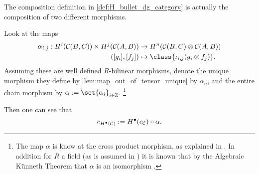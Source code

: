\begin{remark}
    \label{rem:H_bullet_composition_alpha}
    The composition definition in \autoref{def:H_bullet_dg_category} is actually the composition of two different morphisms.

    Look at the maps
    \begin{align*}
        \alpha_{i, j}: H^i(\Cc(B, C)) \times H^j(\Cc(A, B)) &\to H^n(\Cc(B, C) \otimes \Cc(A, B)) \\
        ([g_i], [f_j]) &\mapsto \class{\iota_{i, j}(g_i \otimes f_j)}.
    \end{align*}
    Assuming these are well defined \( R \)-bilinear morphisms, denote the unique morphism they define by \autoref{lem:map_out_of_tensor_unique} by \( \alpha_n \), and the entire chain morphism by \( \alpha := \set{\alpha_i}_{i \in \Zb} \). \footnote{
        The map \( \alpha \) is know at the cross product morphism, as explained in \cite[p. 273]{Hatcher_2002}. In addition for \( R \) a field (as is assumed in \cite{Jasso-Muro_2023}) it is known that by the Algebraic Künneth Theorem that \( \alpha \) is an isomorphism \cite[Theorem 3B.5]{Hatcher_2002}.
    }
    
    Then one can see that
    \[
        c_{H^\bullet({\mathcal{C}})} := H^\bullet(c_{{\mathcal{C}}}) \circ \alpha.
    \] 
\end{remark}
